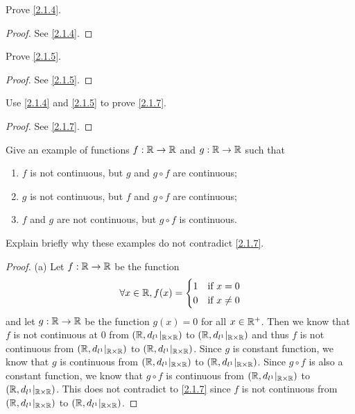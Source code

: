 \exercisesection

\begin{ex}\label{ex:2.1.1}
  Prove \cref{2.1.4}.
\end{ex}

\begin{proof}
  See \cref{2.1.4}.
\end{proof}

\begin{ex}\label{ex:2.1.2}
  Prove \cref{2.1.5}.
\end{ex}

\begin{proof}
  See \cref{2.1.5}.
\end{proof}

\begin{ex}\label{ex:2.1.3}
  Use \cref{2.1.4} and \cref{2.1.5} to prove \cref{2.1.7}.
\end{ex}

\begin{proof}
  See \cref{2.1.7}.
\end{proof}

\begin{ex}\label{ex:2.1.4}
  Give an example of functions \(f : \mathbb{R} \to \mathbb{R}\) and \(g : \mathbb{R} \to \mathbb{R}\) such that
  \begin{enumerate}
    \item \(f\) is not continuous, but \(g\) and \(g \circ f\) are continuous;
    \item \(g\) is not continuous, but \(f\) and \(g \circ f\) are continuous;
    \item \(f\) and \(g\) are not continuous, but \(g \circ f\) is continuous.
  \end{enumerate}
  Explain briefly why these examples do not contradict \cref{2.1.7}.
\end{ex}

\begin{proof}{(a)}
  Let \(f : \mathbb{R} \to \mathbb{R}\) be the function
  \[
    \forall x \in \mathbb{R}, f(x) = \begin{cases}
      1 & \text{if } x = 0    \\
      0 & \text{if } x \neq 0
    \end{cases}
  \]
  and let \(g : \mathbb{R} \to \mathbb{R}\) be the function \(g(x) = 0\) for all \(x \in \mathbb{R}^+\).
  Then we know that \(f\) is not continuous at \(0\) from \((\mathbb{R}, d_{l^1}|_{\mathbb{R} \times \mathbb{R}})\) to \((\mathbb{R}, d_{l^1}|_{\mathbb{R} \times \mathbb{R}})\) and thus \(f\) is not continuous from \((\mathbb{R}, d_{l^1}|_{\mathbb{R} \times \mathbb{R}})\) to \((\mathbb{R}, d_{l^1}|_{\mathbb{R} \times \mathbb{R}})\).
  Since \(g\) is constant function, we know that \(g\) is continuous from \((\mathbb{R}, d_{l^1}|_{\mathbb{R} \times \mathbb{R}})\) to \((\mathbb{R}, d_{l^1}|_{\mathbb{R} \times \mathbb{R}})\).
  Since \(g \circ f\) is also a constant function, we know that \(g \circ f\) is continuous from \((\mathbb{R}, d_{l^1}|_{\mathbb{R} \times \mathbb{R}})\) to \((\mathbb{R}, d_{l^1}|_{\mathbb{R} \times \mathbb{R}})\).
  This does not contradict to \cref{2.1.7} since \(f\) is not continuous from \((\mathbb{R}, d_{l^1}|_{\mathbb{R} \times \mathbb{R}})\) to \((\mathbb{R}, d_{l^1}|_{\mathbb{R} \times \mathbb{R}})\).
\end{proof}

